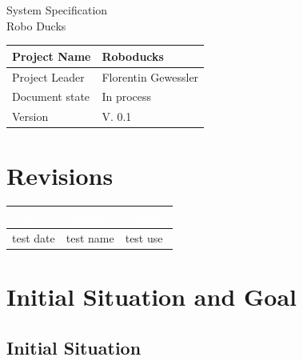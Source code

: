 \documentclass[12pt]{article}
\theoremstyle{definition}
\newcommand{\projectname}{Roboducks}
\newcommand{\productname}{Robo Ducks}
\newcommand{\projectleader}{Florentin Gewessler}
\newcommand{\documentstatus}{In process}
\newcommand{\version}{V. 0.1}
\begin{document}
\begin{titlepage}
\begin{flushright}

\end{flushright}

\vspace{10em}

\begin{center}
{\Huge System Specification} \\[3em]
{\LARGE \productname} \\[3em]
\end{center}

\begin{flushleft}
\begin{tabular}{|l|l|}
\hline
Project Name & \projectname \\ \hline
Project Leader & \projectleader \\ \hline
Document state & \documentstatus \\ \hline
Version & \version \\ \hline
\end{tabular}
\end{flushleft}

\end{titlepage}
\section*{Revisions}
\begin{tabular}{|l|l|l|}
\hline
\cellcolor[gray]{0.5}\textcolor{white}{Date} & \cellcolor[gray]{0.5}\textcolor{white}{Author} & \cellcolor[gray]{0.5}\textcolor{white}{Change} \\ \hline
test date&test name&test use \\ \hline
\end{tabular}
\pagebreak

\tableofcontents

\pagebreak
\section{Initial Situation and Goal}

\subsection{Initial Situation}
\end{document}
